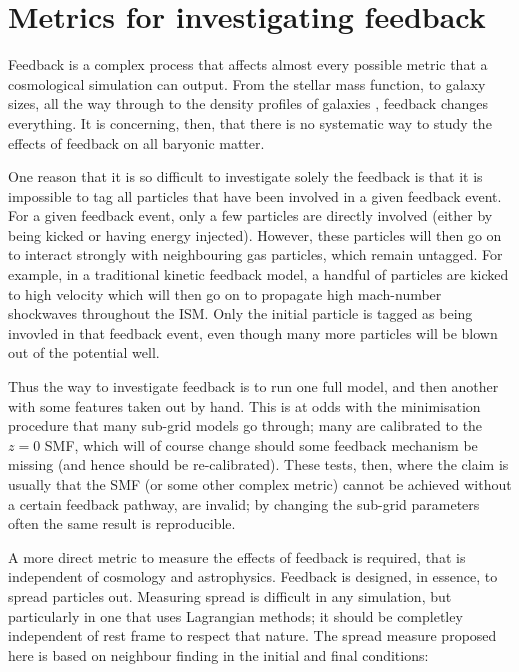 \section{Metrics for investigating feedback}
\label{sec:feedbackmetrics}

Feedback is a complex process that affects almost every possible metric that a
cosmological simulation can output. From the stellar mass function, to galaxy
sizes, all the way through to the density profiles of galaxies
\citep{BenitezLlambay2018}, feedback changes everything. It is concerning,
then, that there is no systematic way to study the effects of feedback on all
baryonic matter.

One reason that it is so difficult to investigate solely the feedback is that
it is impossible to tag all particles that have been involved in a given
feedback event. For a given feedback event, only a few particles are directly
involved (either by being kicked or having energy injected). However, these
particles will then go on to interact strongly with neighbouring gas
particles, which remain untagged. For example, in a traditional kinetic
feedback model, a handful of particles are kicked to high velocity which will
then go on to propagate high mach-number shockwaves throughout the ISM. Only
the initial particle is tagged as being invovled in that feedback event, even
though many more particles will be blown out of the potential well.

Thus the way to investigate feedback is to run one full model, and then
another with some features taken out by hand. This is at odds with the
minimisation procedure that many sub-grid models go through; many are
calibrated to the $z=0$ SMF, which will of course change should some feedback
mechanism be missing (and hence should be re-calibrated). These tests, then,
where the claim is usually that the SMF (or some other complex metric) cannot
be achieved without a certain feedback pathway, are invalid; by changing the
sub-grid parameters often the same result is reproducible.

A more direct metric to measure the effects of feedback is required, that is
independent of cosmology and astrophysics. Feedback is designed, in essence,
to spread particles out. Measuring spread is difficult in any simulation, but
particularly in one that uses Lagrangian methods; it should be completley
independent of rest frame to respect that nature. The spread measure proposed
here is based on neighbour finding in the initial and final conditions:

